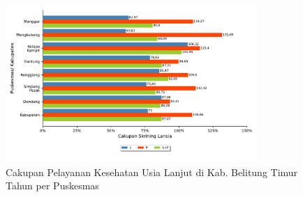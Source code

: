 \begin{figure}[H]
    \centering
    \includegraphics[width=0.85\textwidth]{bab_05/bab_05_30_skriningLansia}
    \caption{Cakupan Pelayanan Kesehatan Usia Lanjut di Kab. Belitung
Timur Tahun \tP per Puskesmas}
    \label{fig:Cakupan-Yankes-Usila}
\end{figure}

